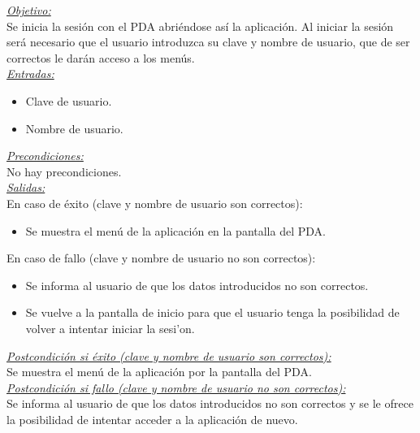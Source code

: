 \emph{\underline{Objetivo:}}\\

Se inicia la sesi\'on con el PDA abri\'endose as\'i la aplicaci\'on. Al iniciar la sesi\'on ser\'a necesario que el usuario introduzca su clave y nombre de usuario, que de ser correctos le dar\'an acceso a los men\'us.	\\

\emph{\underline{Entradas:}}
\begin{itemize}
\item Clave de usuario.
\item Nombre de usuario.
\end{itemize}

\emph{\underline{Precondiciones:}}\\

No hay precondiciones.\\

\emph{\underline{Salidas:}}\\
	
En caso de \'exito (clave y nombre de usuario son correctos): 
\begin{itemize}
	\item Se muestra el men\'u de la aplicaci\'on en la pantalla del PDA.
\end{itemize}

En caso de fallo (clave y nombre de usuario no son correctos): 
\begin{itemize}
	\item Se informa al usuario de que los datos introducidos no son correctos.
	\item Se vuelve a la pantalla de inicio para que el usuario tenga la posibilidad de volver  a intentar iniciar la sesi'on.
\end{itemize}

\emph{\underline{Postcondici\'on si \'exito (clave y nombre de usuario son correctos):}}\\

Se muestra el men\'u de la aplicaci\'on por la pantalla del PDA.\\

\emph{\underline{Postcondici\'on si fallo (clave y nombre de usuario no son correctos):}}\\

Se informa al usuario de que los datos introducidos no son correctos y se le ofrece la posibilidad de intentar acceder a la aplicaci\'on de nuevo.\\

